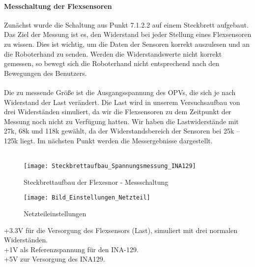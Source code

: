 \documentclass[titlepage,12pt,twoside]{article}
\begin{document}
\paragraph{Messchaltung der Flexsensoren}
\hfill \break
\hfill \break
Zunächst wurde die Schaltung aus Punkt 7.1.2.2 auf einem Steckbrett aufgebaut. Das Ziel der Messung ist es, den Widerstand 
bei jeder Stellung eines Flexsensoren zu wissen. Dies ist wichtig, um die Daten der Sensoren korrekt auszulesen und an die 
Roboterhand zu senden. Werden die Widerstandswerte nicht korrekt gemessen, so bewegt sich die Roboterhand nicht entsprechend 
nach den Bewegungen des Benutzers. \\
\\
Die zu messende Größe ist die Ausgangsspannung des OPVs, die sich je nach Widerstand der Last verändert. Die Last wird in 
unserem Versuchsaufbau von drei Widerständen simuliert, da wir die Flexsensoren zu dem Zeitpunkt der Messung noch nicht zu 
Verfügung hatten. Wir haben die Lastwiderstände mit 27k, 68k und 118k gewählt, da der Widerstandsbereich der Sensoren bei 
25k – 125k liegt. Im nächsten Punkt werden die Messergebnisse dargestellt. \\
\\
\begin{figure}[H]
	\begin{center}
		\scalebox{1.0}
		{\texttt{[image: Steckbrettaufbau\_Spannungsmessung\_INA129]}}
		\caption{Steckbrettaufbau der Flexesnor - Messschaltung}
		\label{fig:Steckbrettaufbau_Spannungsmessung_INA129}	
	\end{center}
\end{figure}
\hfill \break
\hfill \break
\begin{figure}[H]
	\begin{center}
		\scalebox{1.0}
		{\texttt{[image: Bild\_Einstellungen\_Netzteil]}}
		\caption{Netzteileinstellungen}
		\label{fig:Bild_Einstellungen_Netzteil}	
	\end{center}
\end{figure}
\hfill \break
+3.3V für die Versorgung des Flexsensors (Last), simuliert mit drei normalen Widerständen.\\
+1V als Referenzspannung für den INA-129.\\
+5V zur Versorgung des INA129.\\
\\
\end{document}
